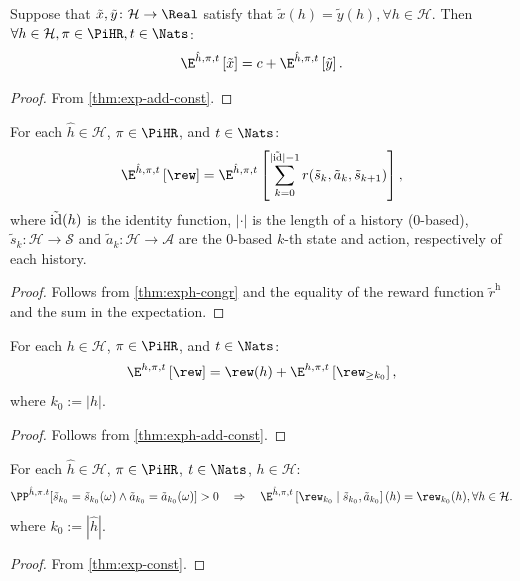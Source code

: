 \begin{theorem} \label{thm:exph-add-const}
Suppose that $\tilde{x}, \tilde{y} \colon \mathcal{H} \to \Real $ satisfy that $\tilde{x}(h) = \tilde{y}(h), \forall h \in \mathcal{H}$. Then $\forall h\in \mathcal{H}, \pi\in \PiHR, t \in \Nats$:
\[
  \E^{\hat{h}, \pi, t} \left[ \tilde{x} \right]
  =
  c + \E^{\hat{h}, \pi, t} \left[ \tilde{y} \right].
\]
\end{theorem}
\begin{proof}
From \cref{thm:exp-add-const}.
\end{proof}

\begin{theorem}\label{thm:expret-eq-sum-rew}
For each $\hat{h}\in \mathcal{H}$, $\pi \in \PiHR$, and $t\in \Nats$:
\[
\E^{\hat{h}, \pi, t} \left[ \rew \right]
=
\E^{\hat{h}, \pi, t} \left[ \sum_{k=0}^{|\tilde{\id}|-1}  r(\tilde{s}_k, \tilde{a}_k, \tilde{s}_{k+1}) \right],
\]
where $\tilde{\operatorname{id}}(h)$ is the identity function, $|\cdot|$ is the length of a history (0-based), $\tilde{s}_k\colon \mathcal{H} \to \mathcal{S}$ and $\tilde{a}_k\colon \mathcal{H} \to \mathcal{A}$ are the 0-based $k$-th state and action, respectively of each history.
\end{theorem}
\begin{proof}
Follows from \cref{thm:exph-congr} and the equality of the reward function $\tilde{r}^{\mathrm{h}}$ and the sum in the expectation.
\end{proof}

\begin{theorem}\label{thm:sum-rew-eq-sum-rew-rg}
For each $h\in \mathcal{H}$, $\pi \in \PiHR$, and $t\in \Nats$:
\[
\E^{h, \pi, t} \left[  \rew \right]
=
\rew(h) + \E^{h, \pi, t} \left[ \rew_{\ge k_0} \right],
\]
where $k_0:=|h|$.
\end{theorem}
\begin{proof}
Follows from \cref{thm:exph-add-const}.
\end{proof}

\begin{theorem}\label{thm:sum-rew-cnd}
For each $\hat{h}\in \mathcal{H}$, $\pi \in \PiHR$, $t\in \Nats$, $h\in \mathcal{H}$:
\begin{equation*}
  \PP^{\hat{h},\pi.t}[\tilde{s}_{k_0}=\tilde{s}_{k_0}(\omega) \wedge \tilde{a}_{k_0} = \tilde{a}_{k_0}(\omega) ] > 0
\quad\Rightarrow \quad
  \E^{\hat{h}, \pi, t} \left[ \rew_{k_0} \mid  \tilde{s}_{k_0}, \tilde{a}_{k_0}\right](h) = \rew_{k_0}(h), \forall h \in \mathcal{H}.
\end{equation*}
where $k_0:= |\hat{h}|$.
\end{theorem}
\begin{proof}
 From \cref{thm:exp-const}. 
\end{proof}

